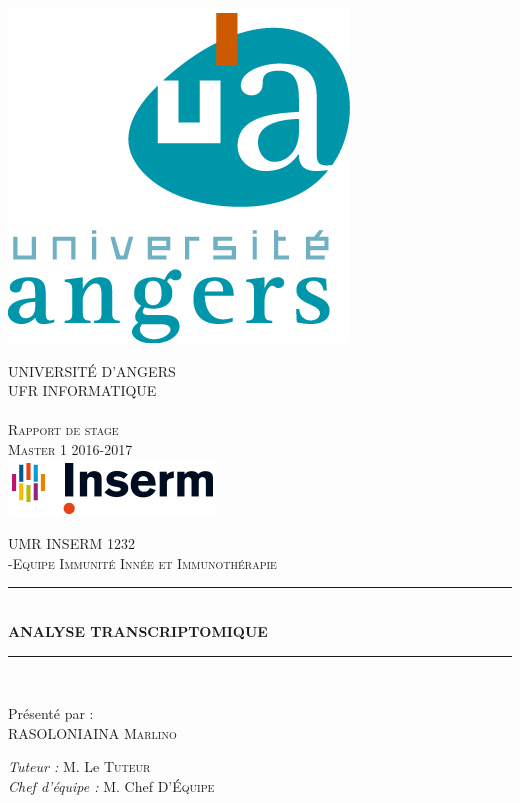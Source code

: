 \documentclass[a4paper,10pt]{article}
\newcommand{\HRule}{\rule{\linewidth}{0.5mm}}
\begin{document}
\begin{titlepage}
  \begin{sffamily}
  \begin{center}

    \includegraphics{./image/ua_v_couleur.jpg}
    
    \textsc{ UNIVERSIT\'{E} D'ANGERS \\ UFR INFORMATIQUE}\\[0.5cm]
    \textsc{ \\ Rapport de stage \\ Master 1 2016-2017 }\\[1.5cm]
    
    \includegraphics{./image/logo-generique-SD.png}
    
    \textsc{UMR INSERM 1232 \\-Equipe Immunité Innée et Immunothérapie}\\[1cm]
     
    \HRule \\[0.4cm]
    { \huge \bfseries ANALYSE TRANSCRIPTOMIQUE\\[0.4cm] }

    \HRule \\[2cm]

    \begin{minipage}{0.4\textwidth}
      \begin{flushleft} \large
        \large Présenté par : \\\textsc{RASOLONIAINA Marlino}
      \end{flushleft}
    \end{minipage}
    \begin{minipage}{0.4\textwidth}
      \begin{flushright} \large
        \emph{Tuteur :} M. Le \textsc{Tuteur}\\
        \emph{Chef d'équipe : } M. Chef \textsc{D’Équipe}
      \end{flushright}
    \end{minipage}


\end{center}
\end{sffamily}
\end{titlepage}
\end{document}
